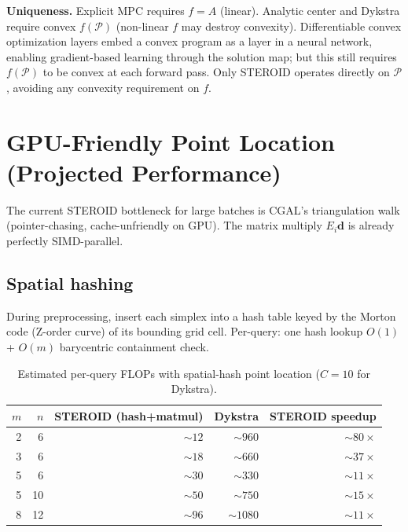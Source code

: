 \documentclass[review,onefignum,onetabnum]{./SIAM_template/siamart171218}
\begin{document}
\textbf{Uniqueness.}  Explicit MPC requires $f = A$ (linear).  Analytic center and
Dykstra require convex $f(\mathcal{P})$ (non-linear $f$ may destroy convexity).
Differentiable convex optimization layers \cite{cvxpylayers} embed a convex
program as a layer in a neural network, enabling gradient-based learning through
the solution map; but this still requires $f(\mathcal{P})$ to be convex at each
forward pass.  Only STEROID operates directly on $\mathcal{P}$, avoiding any
convexity requirement on $f$.

\section{GPU-Friendly Point Location (Projected Performance)}
\label{sec:gpu}

The current STEROID bottleneck for large batches is CGAL's triangulation walk
(pointer-chasing, cache-unfriendly on GPU).  The matrix multiply $E_i \mathbf{d}$
is already perfectly SIMD-parallel.

\subsection{Spatial hashing}

During preprocessing, insert each simplex into a hash table keyed by the Morton
code (Z-order curve) \cite{MortonCode1966, Berger2023}
of its bounding grid cell.  Per-query: one hash lookup
$O(1)$ + $O(m)$ barycentric containment check.

\begin{table}[h]
	\caption{Estimated per-query FLOPs with spatial-hash point location ($C=10$ for
		Dykstra).}
	\label{tab:gpu_flops}
	\centering
	\begin{tabular}{rrrrr}
		\toprule
		$m$ & $n$ & STEROID (hash+matmul) & Dykstra     & STEROID speedup \\
		\midrule
		2   & 6   & $\sim 12$             & $\sim 960$  & $\sim 80\times$ \\
		3   & 6   & $\sim 18$             & $\sim 660$  & $\sim 37\times$ \\
		5   & 6   & $\sim 30$             & $\sim 330$  & $\sim 11\times$ \\
		5   & 10  & $\sim 50$             & $\sim 750$  & $\sim 15\times$ \\
		8   & 12  & $\sim 96$             & $\sim 1080$ & $\sim 11\times$ \\
		\bottomrule
	\end{tabular}
\end{table}
\end{document}
